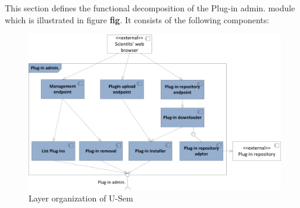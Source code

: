 This section defines the functional decomposition of the Plug-in admin. module which is illustrated in figure \textbf{fig}. It consists of the following components:

\begin{figure}[h!]
  \centering
  	\includegraphics[scale=0.75]{plug-in/layers/admin-func.png}
  \caption{Layer organization of U-Sem}
\end{figure}

